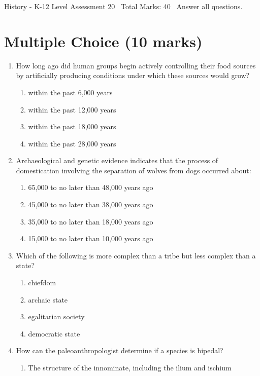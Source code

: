 \documentclass[12pt]{article}
\begin{document}
\begin{center}
History - K-12 Level Assessment 20 \
Total Marks: 40 \
Answer all questions.
\end{center}

\section*{Multiple Choice (10 marks)}
\begin{enumerate}[label=\arabic*.]
\item How long ago did human groups begin actively controlling their food sources by artificially producing conditions under which these sources would grow?
\begin{enumerate}[label=(\alph*)]
    \item within the past 6,000 years
    \item within the past 12,000 years
    \item within the past 18,000 years
    \item within the past 28,000 years
\end{enumerate}
\item Archaeological and genetic evidence indicates that the process of domestication involving the separation of wolves from dogs occurred about:
\begin{enumerate}[label=(\alph*)]
    \item 65,000 to no later than 48,000 years ago
    \item 45,000 to no later than 38,000 years ago
    \item 35,000 to no later than 18,000 years ago
    \item 15,000 to no later than 10,000 years ago
\end{enumerate}
\item Which of the following is more complex than a tribe but less complex than a state?
\begin{enumerate}[label=(\alph*)]
    \item chiefdom
    \item archaic state
    \item egalitarian society
    \item democratic state
\end{enumerate}
\item How can the paleoanthropologist determine if a species is bipedal?
\begin{enumerate}[label=(\alph*)]
    \item The structure of the innominate, including the ilium and ischium

\end{enumerate}
\end{enumerate}
\end{document}
